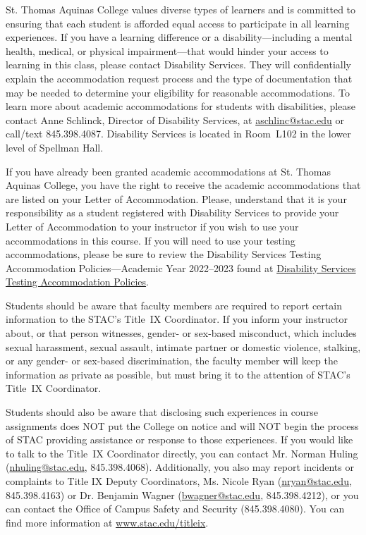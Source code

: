\documentclass[11pt,letterpaper]{article}
\begin{document}
St. Thomas Aquinas College values diverse types of learners and is committed to ensuring that each student is afforded equal access to participate in all learning experiences. If you have a learning difference or a disability---including a mental health, medical, or physical impairment---that would hinder your access to learning in this class, please contact Disability Services. They will confidentially explain the accommodation request process and the type of documentation that may be needed to determine your eligibility for reasonable accommodations. To learn more about academic accommodations for students with disabilities, please contact Anne Schlinck, Director of Disability Services, at \href{mailto:aschlinc@stac.edu}{aschlinc@stac.edu} or call/text 845.398.4087. Disability Services is located in Room~L102 in the lower level of Spellman Hall. \pspace

If you have already been granted academic accommodations at St. Thomas Aquinas College, you have the right to receive the academic accommodations that are listed on your Letter of Accommodation. Please, understand that it is your responsibility as a student registered with Disability Services to provide your Letter of Accommodation to your instructor if you wish to use your accommodations in this course. If you will need to use your testing accommodations, please be sure to review the Disability Services Testing Accommodation Policies---Academic Year 2022--2023 found at \href{https://docs.google.com/document/d/1V5iUtgypiS8kClqhSLPde7AOSZPoLu6CsIDcpiEic2w/edit}{Disability Services Testing Accommodation Policies}. \sectionbreak




Students should be aware that faculty members are required to report certain information to the STAC’s Title~IX Coordinator. If you inform your instructor about, or that person witnesses, gender- or sex-based misconduct, which includes sexual harassment, sexual assault, intimate partner or domestic violence, stalking, or any gender- or sex-based discrimination, the faculty member will keep the information as private as possible, but must bring it to the attention of STAC’s Title~IX Coordinator. \pspace

Students should also be aware that disclosing such experiences in course assignments does NOT put the College on notice and will NOT begin the process of STAC providing assistance or response to those experiences. If you would like to talk to the Title~IX Coordinator directly, you can contact Mr. Norman Huling (\href{mailto:nhuling@stac.edu}{nhuling@stac.edu}, 845.398.4068). Additionally, you also may report incidents or complaints to Title IX Deputy Coordinators, Ms. Nicole Ryan (\href{mailto:nryan@stac.edu}{nryan@stac.edu}, 845.398.4163) or Dr. Benjamin Wagner (\href{mailto:bwagner@stac.edu}{bwagner@stac.edu}, 845.398.4212), or you can contact the Office of Campus Safety and Security (845.398.4080). You can find more information at \url{www.stac.edu/titleix}. \pspace
\end{document}

